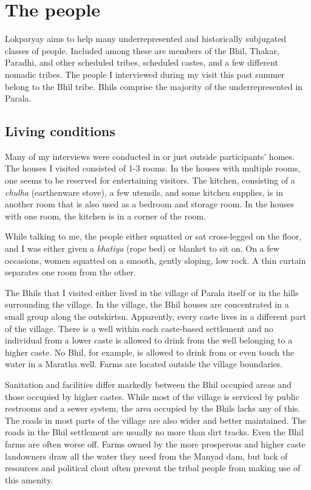 \documentclass[report.tex]{subfiles}
\begin{document}
\section{The people}\label{sec:people}

Lokparyay aims to help many underrepresented and historically subjugated classes of people. Included among these are members of the Bhil, Thakar, Paradhi, and other scheduled tribes, scheduled castes, and a few different nomadic tribes. The people I interviewed during my visit this past summer belong to the Bhil tribe. Bhils comprise the majority of the underrepresented in Parala.

\subsection{Living conditions}\label{subsec:living}

Many of my interviews were conducted in or just outside participants' homes. The houses I visited consisted of 1-3 rooms. In the houses with multiple rooms, one seems to be reserved for entertaining visitors. The kitchen, consisting of a \textit{chulha} (earthenware stove), a few utensils, and some kitchen supplies, is in another room that is also used as a bedroom and storage room. In the houses with one room, the kitchen is in a corner of the room.

While talking to me, the people either squatted or sat cross-legged on the floor, and I was either given a \textit{khatiya} (rope bed) or blanket to sit on. On a few occasions, women squatted on a smooth, gently sloping, low rock. A thin curtain separates one room from the other.

The Bhils that I visited either lived in the village of Parala itself or in the hills surrounding the village. In the village, the Bhil houses are concentrated in a small group along the outskirtsn. Apparently, every caste lives in a different part of the village. There is a well within each caste-based settlement and no individual from a lower caste is allowed to drink from the well belonging to a higher caste. No Bhil, for example, is allowed to drink from or even touch the water in a Maratha well. Farms are located outside the village boundaries.

Sanitation and facilities differ markedly between the Bhil occupied areas and those occupied by higher castes. While most of the village is serviced by public restrooms and a sewer system, the area occupied by the Bhils lacks any of this. The roads in most parts of the village are also wider and better maintained. The roads in the Bhil settlement are usually no more than dirt tracks. Even the Bhil farms are often worse off. Farms owned by the more prosperous and higher caste landowners draw all the water they need from the Manyad dam, but lack of resources and political clout often prevent the tribal people from making use of this amenity.
\end{document}
